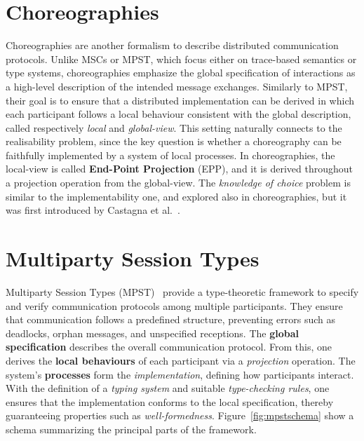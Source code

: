 \section{Choreographies}
Choreographies \cite{montesi2014choreographic} are another formalism to describe  
distributed communication protocols. Unlike MSCs or MPST, which focus either on 
trace-based semantics or type systems, choreographies emphasize the 
global specification of interactions as a high-level description of the 
intended message exchanges. Similarly to MPST, their goal is to ensure that
a distributed  implementation can be derived in which each participant 
follows a local behaviour consistent with the global description, called
respectively \emph{local} and \emph{global-view}. This setting naturally 
connects to the realisability problem, since the key question is whether 
a choreography can be faithfully implemented by a system of local 
processes. In choreographies, the local-view is called \textbf{End-Point Projection} (EPP),
and it is derived throughout a projection operation from the global-view.
The \emph{knowledge of choice} problem is similar to the implementability one,
and explored also in choreographies,
but it was first introduced by Castagna et al.~\cite{castagna2012global}.

\section{Multiparty Session Types}
Multiparty Session Types (MPST)~\cite{honda2008multiparty} 
provide a type-theoretic framework to specify and verify communication 
protocols among multiple participants. They ensure that communication 
follows a predefined structure, preventing errors such as deadlocks, 
orphan messages, and unspecified receptions. The 
\textbf{global specification} describes the overall communication 
protocol. From this, one derives the \textbf{local behaviours} of each 
participant via a \emph{projection} operation. The system's 
\textbf{processes} form the \emph{implementation}, defining how 
participants interact. With the definition of a \emph{typing system} 
and suitable \emph{type-checking rules}, one ensures that the 
implementation conforms to the local specification, thereby 
guaranteeing properties such as \emph{well-formedness}.  
Figure~\ref{fig:mpstschema} show a schema summarizing the principal
parts of the framework.

